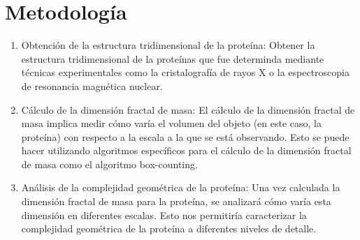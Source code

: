 \documentclass[11pt]{article}
\begin{document}
\clearpage

\section{Metodolog\'{i}a}

\begin{enumerate}
	
\item Obtenci\'{o}n de la estructura tridimensional de la prote\'{i}na: Obtener la estructura tridimensional de la prote\'{i}nas que fue determinda mediante t\'{e}cnicas experimentales como la cristalograf\'{i}a de rayos X o la espectroscopia de resonancia magn\'{e}tica nuclear.

\item C\'{a}lculo de la dimensi\'{o}n fractal de masa: El c\'{a}lculo de la dimensi\'{o}n fractal de masa implica medir c\'{o}mo var\'{i}a el volumen del objeto (en este caso, la prote\'{i}na) con respecto a la escala a la que se est\'{a} observando. Esto se puede hacer utilizando algoritmos espec\'{i}ficos para el c\'{a}lculo de la dimensi\'{o}n fractal de masa como el algoritmo box-counting.

\item An\'{a}lisis de la complejidad geom\'{e}trica de la prote\'{i}na: Una vez calculada la dimensi\'{o}n fractal de masa para la prote\'{i}na, se analizar\'{a} c\'{o}mo var\'{i}a esta dimensi\'{o}n en diferentes escalas. Esto nos permitir\'{i}a caracterizar la complejidad geom\'{e}trica de la prote\'{i}na a diferentes niveles de detalle.

\end{enumerate}

\clearpage
\end{document}
